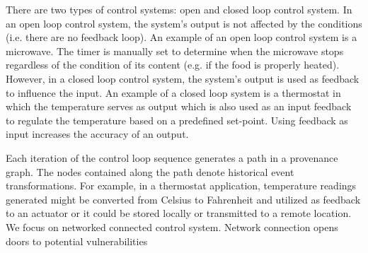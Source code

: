 \par There are two types of control systems: open and closed loop control system. In an open loop control system, the system's output is not affected by the conditions (i.e. there are no feedback loop). An example of an open loop control system is a microwave. The timer is manually set to determine when the microwave stops regardless of the condition of its content (e.g. if the food is properly heated). However, in a closed loop control system, the system's output is used as feedback to influence the input.  An example of a closed loop system is a thermostat in which the temperature serves as output which is also used as an input feedback to regulate the temperature based on a predefined set-point. Using feedback as input increases the accuracy of an output. \par Each iteration of the control loop sequence generates a path in a provenance graph. The nodes contained along the path denote historical event transformations. For example, in a thermostat application, temperature readings generated might be converted from Celsius to Fahrenheit and utilized as feedback to an actuator or it could be stored locally or transmitted to a remote location. We focus on networked connected control system. Network connection opens doors to potential vulnerabilities





 




 





%
%



